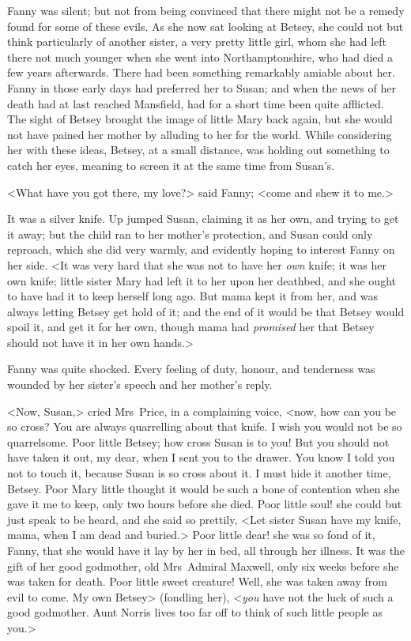 Fanny was silent; but not from being convinced that there might not be a remedy found for some of these evils. As she now sat looking at Betsey, she could not but think particularly of another sister, a very pretty little girl, whom she had left there not much younger when she went into Northamptonshire, who had died a few years afterwards. There had been something remarkably amiable about her. Fanny in those early days had preferred her to Susan; and when the news of her death had at last reached Mansfield, had for a short time been quite afflicted. The sight of Betsey brought the image of little Mary back again, but she would not have pained her mother by alluding to her for the world. While considering her with these ideas, Betsey, at a small distance, was holding out something to catch her eyes, meaning to screen it at the same time from Susan's.

<What have you got there, my love?> said Fanny; <come and shew it to me.>

It was a silver knife. Up jumped Susan, claiming it as her own, and trying to get it away; but the child ran to her mother's protection, and Susan could only reproach, which she did very warmly, and evidently hoping to interest Fanny on her side. <It was very hard that she was not to have her \textit{own}  knife; it was her own knife; little sister Mary had left it to her upon her deathbed, and she ought to have had it to keep herself long ago. But mama kept it from her, and was always letting Betsey get hold of it; and the end of it would be that Betsey would spoil it, and get it for her own, though mama had \textit{promised}  her that Betsey should not have it in her own hands.>

Fanny was quite shocked. Every feeling of duty, honour, and tenderness was wounded by her sister's speech and her mother's reply.

<Now, Susan,> cried Mrs~Price, in a complaining voice, <now, how can you be so cross? You are always quarrelling about that knife. I wish you would not be so quarrelsome. Poor little Betsey; how cross Susan is to you! But you should not have taken it out, my dear, when I sent you to the drawer. You know I told you not to touch it, because Susan is so cross about it. I must hide it another time, Betsey. Poor Mary little thought it would be such a bone of contention when she gave it me to keep, only two hours before she died. Poor little soul! she could but just speak to be heard, and she said so prettily, <Let sister Susan have my knife, mama, when I am dead and buried.> Poor little dear! she was so fond of it, Fanny, that she would have it lay by her in bed, all through her illness. It was the gift of her good godmother, old Mrs~Admiral Maxwell, only six weeks before she was taken for death. Poor little sweet creature! Well, she was taken away from evil to come. My own Betsey> (fondling her), <\textit{you}  have not the luck of such a good godmother. Aunt Norris lives too far off to think of such little people as you.>

